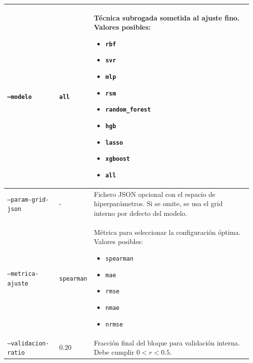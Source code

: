 \begin{longtable}[htbp]{|p{4.2cm}|p{2.2cm}|p{4.85cm}|}
    \texttt{--modelo}
                       & \texttt{all}
                       & Técnica subrogada sometida al ajuste fino. Valores posibles:
    \begin{itemize}
        \setlength{\itemsep}{0pt}
        \setlength{\topsep}{2pt}
        \item \texttt{rbf}
        \item \texttt{svr}
        \item \texttt{mlp}
        \item \texttt{rsm}
        \item \texttt{random\_forest}
        \item \texttt{hgb}
        \item \texttt{lasso}
        \item \texttt{xgboost}
        \item \texttt{all}
    \end{itemize}                                                                                              \\
    \hline

    \texttt{--param-grid-json}
                       & -
                       & Fichero JSON opcional con el espacio de hiperparámetros. Si se omite, se usa
    el grid interno por defecto del modelo.                                                                                   \\
    \hline

    \texttt{--metrica-ajuste}
                       & \texttt{spearman}
                       & Métrica para seleccionar la configuración óptima. Valores posibles:
    \begin{itemize}
        \setlength{\itemsep}{0pt}
        \setlength{\topsep}{2pt}
        \item \texttt{spearman}
        \item \texttt{mae}
        \item \texttt{rmse}
        \item \texttt{nmae}
        \item \texttt{nrmse}
    \end{itemize}                                                                                                  \\
    \hline

    \texttt{--validacion-ratio}
                       & \(0.20\)
                       & Fracción final del bloque para validación interna. Debe cumplir
    \(0 < r < 0.5\).                                                                                                          \\
    \hline


\end{longtable}
